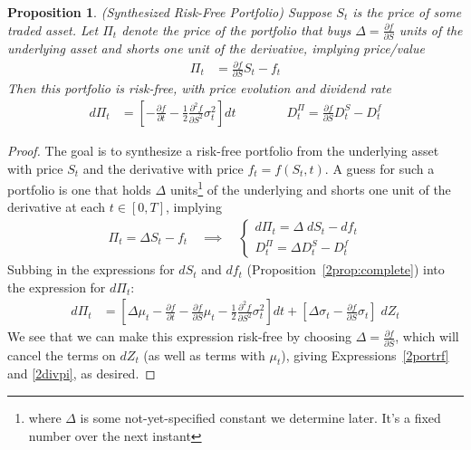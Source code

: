 \documentclass[12pt]{article}
\theoremstyle{plain}
\newtheorem{prop}[thm]{Proposition}
\theoremstyle{definition}
\theoremstyle{remark}
\begin{document}
\begin{prop}\emph{(Synthesized Risk-Free Portfolio)}
\label{2prop:rf}
Suppose $S_t$ is the price of some traded asset.
Let $\Pi_t$ denote the price of the portfolio that buys
$\Delta=\frac{\partial f}{\partial S}$ units of the underlying asset
and shorts one unit of the derivative, implying price/value
\begin{align}
  \Pi_t &= \frac{\partial f}{\partial S} S_t - f_t
  \label{2portrf}
\end{align}
Then this portfolio is risk-free, with price evolution and dividend rate
\begin{align}
  d\Pi_t
  &=
  \left[
  -
  \frac{\partial f}{\partial t}
  -
  \frac{1}{2}
  \frac{\partial^2 f}{\partial S^2}
  \sigma^2_t
  \right]
  dt
  \qquad\qquad
  D_t^\Pi
  =
  \frac{\partial f}{\partial S}
  D_t^S - D_t^f
  \label{2divpi}
\end{align}
\end{prop}
\begin{proof}
The goal is to synthesize a risk-free portfolio from the underlying
asset with price $S_t$ and the derivative with price $f_t=f(S_t,t)$.
A guess for such a portfolio is one that holds $\Delta$ units\footnote{%
  where $\Delta$ is some not-yet-specified constant we determine
  later. It's a fixed number over the next instant
}
of the underlying and shorts one unit of the derivative at each
$t\in [0,T]$, implying
\begin{align}
  \Pi_t = \Delta S_t - f_t
  \quad \implies\quad
  \begin{cases}
    d\Pi_t = \Delta \; dS_t - df_t \\
    D_t^\Pi = \Delta D_t^S - D_t^f
  \end{cases}
  \label{2dpi}
\end{align}
Subbing in the expressions for $dS_t$ and $df_t$
(Proposition~\ref{2prop:complete}) into the expression for $d\Pi_t$:
\begin{align*}
  d\Pi_t
  &=
  \left[
  \Delta \mu_t
  -
  \frac{\partial f}{\partial t}
  -
  \frac{\partial f}{\partial S}
  \mu_t
  -
  \frac{1}{2}
  \frac{\partial^2 f}{\partial S^2}
  \sigma^2_t
  \right]
  dt
  +
  \left[
  \Delta \sigma_t
  - \frac{\partial f}{\partial S}
  \sigma_t
  \right]
  \;dZ_t
\end{align*}
We see that we can make this expression risk-free by choosing
$\Delta = \frac{\partial f}{\partial S}$, which will cancel the terms
on $dZ_t$ (as well as terms with $\mu_t$), giving
Expressions~\ref{2portrf} and \ref{2divpi}, as desired.
\end{proof}
\end{document}
